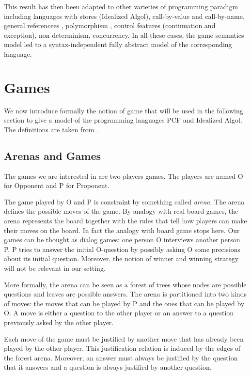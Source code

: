This result has then been adapted to other varieties of programming
paradigm including languages with stores (Idealized Algol),
call-by-value \citep{honda99gametheoretic, abramsky98callbyvalue}
and call-by-name, general referencees
\citep{DBLP:conf/lics/AbramskyHM98}, polymorphism
\citep{DBLP:journals/apal/AbramskyJ05}, control features
(continuation and exception), non determinism, concurrency. In all
these cases, the game semantics model led to a syntax-independent
fully abstract model of the corresponding language.

\section{Games}
\label{sec:catgames}

We now introduce formally the notion of game that will be used in
the following section to give a model of the programming languages
PCF and Idealized Algol. The definitions are taken from
\cite{abramsky:game-semantics-tutorial, hylandong_pcf,
abramsky94full}.


\subsection{Arenas and Games}

The games we are interested in are two-players games. The players are named O for Opponent and P for Proponent.

The game played by O and P is constraint by something called
\emph{arena}. The arena defines the possible moves of the game. By
analogy with real board games, the arena represents the board
together with the rules that tell how players can make their moves
on the board. In fact the analogy with board game stops here. Our
games can be thought as dialog games: one person O interviews
another person P, P tries to answer the initial O-question by
possibly asking O some precisions about its initial question.
Moreover, the notion of winner and winning strategy will not be
relevant in our setting.


More formally, the arena can be seen as a forest of trees whose nodes are possible questions and leaves are possible answers.
The arena is partitioned into two kinds of moves: the moves that can be played by P and the ones that can be played by O.
A move is either a question to the other player or an answer to a question previously asked by the other player.

Each move of the game must be justified by another move that has already been played by the other player. This justification relation
is induced by the edges of the forest arena. Moreover, an answer must always be justified by the question that it answers and a question
is always justified by another question.

